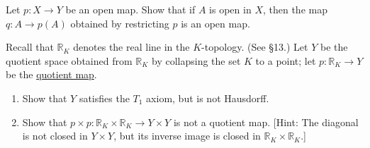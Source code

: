   \begin{exercise}[Munkres 22.5]
    Let $p : X \to Y$ be an open map. Show that if $A$ is open in $X$, then the map $q : A \to p(A)$ obtained by restricting $p$ is an open map.
  \end{exercise}

  \begin{exercise}[Munkres 22.6]
    Recall that $\mathbb{R}_K$ denotes the real line in the $K$-topology. (See \S13.) Let $Y$ be the quotient space obtained from $\mathbb{R}_K$ by collapsing the set $K$ to a point; let $p : \mathbb{R}_K \to Y$ be the \hyperref[def:quotient-map]{quotient map}.
    \begin{enumerate} 
      \item[(a)] Show that $Y$ satisfies the $T_1$ axiom, but is not Hausdorff.
      \item[(b)] Show that $p \times p : \mathbb{R}_K \times \mathbb{R}_K \to Y \times Y$ is not a quotient map. [Hint: The diagonal is not closed in $Y \times Y$, but its inverse image is closed in $\mathbb{R}_K \times \mathbb{R}_K$.]
    \end{enumerate}
  \end{exercise}

